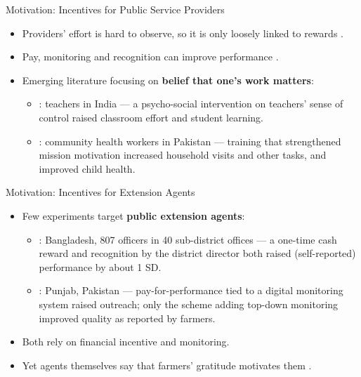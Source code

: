 \documentclass[aspectratio=169]{beamer}
\begin{document}
\begin{frame}{Motivation: Incentives for Public Service Providers}
	\begin{itemize}\small
		\item Providers' effort is hard to observe, so it is only loosely linked to rewards \citep{chaudhury_missing_2006, das_money_2007, finan_chapter_2017}.
		\vspace{0.2cm}
		\item Pay, monitoring and recognition can improve performance \citep{muralidharan_teacher_2011, duflo_incentives_2012, ashraf_awards_2014, mansuri_money_2023}.
		\vspace{0.2cm}
		\item Emerging literature focusing on \textbf{belief that one's work matters}:
		\begin{itemize}\small
			\item \citet{Kaur2023}: teachers in India --- a psycho-social intervention on teachers' sense of control raised classroom effort and student learning.
			\item \citet{khan_mission_2025}: community health workers in Pakistan --- training that strengthened mission motivation increased household visits and other tasks, and improved child health.
		\end{itemize}
	\end{itemize}
\end{frame}

\begin{frame}{Motivation: Incentives for Extension Agents}
	\begin{itemize}\small
		\item Few experiments target \textbf{public extension agents}:
		\begin{itemize}\small
			\item \citet{alam_incentives_2024}: Bangladesh, 807 officers in 40 sub-district offices --- a one-time cash reward and recognition by the district director both raised (self-reported) performance by about 1 SD.
			\item \citet{Genicot2022}: Punjab, Pakistan --- pay-for-performance tied to a digital monitoring system raised outreach; only the scheme adding top-down monitoring improved quality as reported by farmers.
		\end{itemize}
		\vspace{0.2cm}
		\item Both rely on financial incentive and monitoring. 
		\vspace{0.2cm}
        \item Yet agents themselves say that farmers' gratitude
		motivates them \citep{Ragasa2013}. 
	\end{itemize}
\end{frame}
\end{document}
